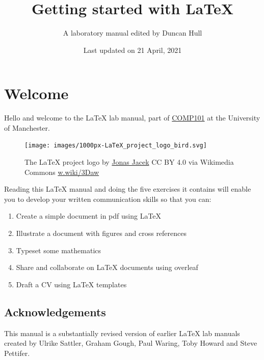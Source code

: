 \documentclass[
]{book}
\title{Getting started with LaTeX}
\author{A laboratory manual edited by Duncan Hull}
\date{Last updated on 21 April, 2021}
\providecommand{\tightlist}{%
  \setlength{\itemsep}{0pt}\setlength{\parskip}{0pt}}
\begin{document}
\maketitle

{
\setcounter{tocdepth}{1}
\tableofcontents
}
\hypertarget{welcome}{%
\chapter*{Welcome}\label{welcome}}

Hello and welcome to the LaTeX lab manual, part of \href{https://studentnet.cs.manchester.ac.uk/ugt/COMP10120/syllabus/}{COMP101} at the University of Manchester.

\begin{figure}

{\centering \texttt{[image: images/1000px-LaTeX\_project\_logo\_bird.svg]} 

}

\caption{The LaTeX project logo by \href{https://www.jonas.me/}{Jonas Jacek} CC BY 4.0 via Wikimedia Commons \href{https://w.wiki/3Daw}{w.wiki/3Daw}}\label{fig:latexproject-fig}
\end{figure}



Reading this LaTeX manual and doing the five exercises it contains will enable you to develop your written communication skills so that you can:

\begin{enumerate}
\def\labelenumi{\arabic{enumi}.}
\tightlist
\item
  Create a simple document in pdf using LaTeX
\item
  Illustrate a document with figures and cross references
\item
  Typeset some mathematics
\item
  Share and collaborate on LaTeX documents using overleaf
\item
  Draft a CV using LaTeX templates
\end{enumerate}

\hypertarget{acknowledgements}{%
\section*{Acknowledgements}\label{acknowledgements}}

This manual is a substantially revised version of earlier LaTeX lab manuals created by Ulrike Sattler, Graham Gough, Paul Waring, Toby Howard and Steve Pettifer.
\end{document}

